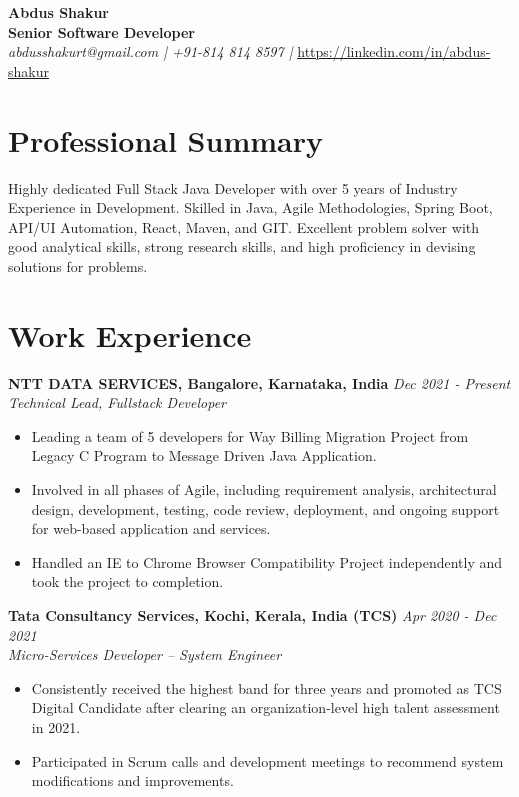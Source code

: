 \documentclass[a4paper,10pt]{article}
\begin{document}
\begin{center}
    \textbf{\LARGE Abdus Shakur} \\
    \vspace{5pt}
    \textbf{Senior Software Developer} \\
    \vspace{5pt}
    \textit{abdusshakurt@gmail.com | +91-814 814 8597 | } \url{https://linkedin.com/in/abdus-shakur}
\end{center}

\section*{Professional Summary}
Highly dedicated Full Stack Java Developer with over 5 years of Industry Experience in Development. Skilled in Java, Agile Methodologies, Spring Boot, API/UI Automation, React, Maven, and GIT. Excellent problem solver with good analytical skills, strong research skills, and high proficiency in devising solutions for problems.

\section*{Work Experience}

\textbf{NTT DATA SERVICES, Bangalore, Karnataka, India} \hfill \textit{Dec 2021 - Present} \\
\textit{Technical Lead, Fullstack Developer} \\
\begin{itemize}
    \item Leading a team of 5 developers for Way Billing Migration Project from Legacy C Program to Message Driven Java Application.
    \item Involved in all phases of Agile, including requirement analysis, architectural design, development, testing, code review, deployment, and ongoing support for web-based application and services.
    \item Handled an IE to Chrome Browser Compatibility Project independently and took the project to completion.
\end{itemize}

\textbf{Tata Consultancy Services, Kochi, Kerala, India (TCS)} \hfill \textit{Apr 2020 - Dec 2021} \\
\textit{Micro-Services Developer – System Engineer} \\
\begin{itemize}
    \item Consistently received the highest band for three years and promoted as TCS Digital Candidate after clearing an organization-level high talent assessment in 2021.
    \item Participated in Scrum calls and development meetings to recommend system modifications and improvements.
\end{itemize}
\end{document}

